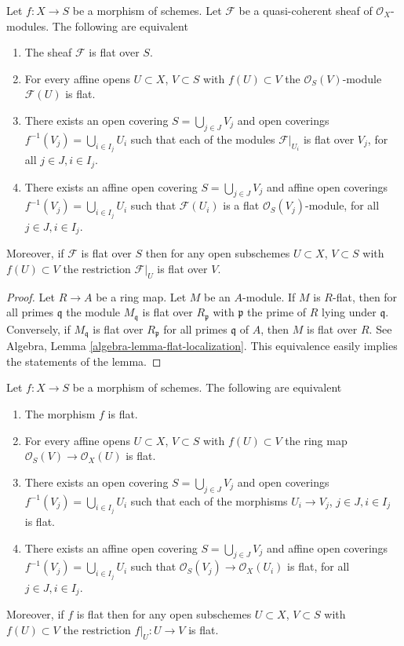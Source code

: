 \begin{lemma}
\label{lemma-flat-module-characterize}
Let $f : X \to S$ be a morphism of schemes.
Let $\mathcal{F}$ be a quasi-coherent sheaf of $\mathcal{O}_X$-modules.
The following are equivalent
\begin{enumerate}
\item The sheaf $\mathcal{F}$ is flat over $S$.
\item For every affine opens $U \subset X$, $V \subset S$
with $f(U) \subset V$ the $\mathcal{O}_S(V)$-module $\mathcal{F}(U)$ is flat.
\item There exists an open covering $S = \bigcup_{j \in J} V_j$
and open coverings $f^{-1}(V_j) = \bigcup_{i \in I_j} U_i$ such
that each of the modules $\mathcal{F}|_{U_i}$ is
flat over $V_j$, for all $j\in J, i\in I_j$.
\item There exists an affine open covering $S = \bigcup_{j \in J} V_j$
and affine open coverings $f^{-1}(V_j) = \bigcup_{i \in I_j} U_i$ such
that $\mathcal{F}(U_i)$ is a flat $\mathcal{O}_S(V_j)$-module, for all
$j\in J, i\in I_j$.
\end{enumerate}
Moreover, if $\mathcal{F}$ is flat over $S$ then for
any open subschemes $U \subset X$, $V \subset S$ with $f(U) \subset V$
the restriction $\mathcal{F}|_U$ is flat over $V$.
\end{lemma}

\begin{proof}
Let $R \to A$ be a ring map. Let $M$ be an $A$-module.
If $M$ is $R$-flat, then for all primes
$\mathfrak q$ the module $M_{\mathfrak q}$ is flat over $R_{\mathfrak p}$
with $\mathfrak p$ the prime of $R$ lying under $\mathfrak q$. Conversely, if
$M_{\mathfrak q}$ is flat over $R_{\mathfrak p}$ for all primes $\mathfrak q$
of $A$, then $M$ is flat over $R$. See
Algebra, Lemma \ref{algebra-lemma-flat-localization}.
This equivalence easily implies the statements of the lemma.
\end{proof}

\begin{lemma}
\label{lemma-flat-characterize}
Let $f : X \to S$ be a morphism of schemes.
The following are equivalent
\begin{enumerate}
\item The morphism $f$ is flat.
\item For every affine opens $U \subset X$, $V \subset S$
with $f(U) \subset V$ the ring map
$\mathcal{O}_S(V) \to \mathcal{O}_X(U)$ is flat.
\item There exists an open covering $S = \bigcup_{j \in J} V_j$
and open coverings $f^{-1}(V_j) = \bigcup_{i \in I_j} U_i$ such
that each of the morphisms $U_i \to V_j$, $j\in J, i\in I_j$
is flat.
\item There exists an affine open covering $S = \bigcup_{j \in J} V_j$
and affine open coverings $f^{-1}(V_j) = \bigcup_{i \in I_j} U_i$ such
that $\mathcal{O}_S(V_j) \to \mathcal{O}_X(U_i)$ is flat, for all
$j\in J, i\in I_j$.
\end{enumerate}
Moreover, if $f$ is flat then for
any open subschemes $U \subset X$, $V \subset S$ with $f(U) \subset V$
the restriction $f|_U : U \to V$ is flat.
\end{lemma}

